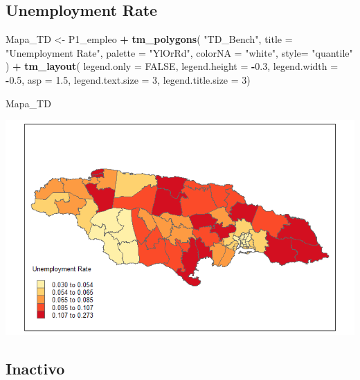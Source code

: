 \documentclass[
  12pt,
]{book}
\newenvironment{Shaded}{\begin{snugshade}}{\end{snugshade}}
\newcommand{\AttributeTok}[1]{\textcolor[rgb]{0.13,0.29,0.53}{#1}}
\newcommand{\ConstantTok}[1]{\textcolor[rgb]{0.56,0.35,0.01}{#1}}
\newcommand{\DecValTok}[1]{\textcolor[rgb]{0.00,0.00,0.81}{#1}}
\newcommand{\FloatTok}[1]{\textcolor[rgb]{0.00,0.00,0.81}{#1}}
\newcommand{\FunctionTok}[1]{\textcolor[rgb]{0.13,0.29,0.53}{\textbf{#1}}}
\newcommand{\NormalTok}[1]{#1}
\newcommand{\OtherTok}[1]{\textcolor[rgb]{0.56,0.35,0.01}{#1}}
\newcommand{\SpecialCharTok}[1]{\textcolor[rgb]{0.81,0.36,0.00}{\textbf{#1}}}
\newcommand{\StringTok}[1]{\textcolor[rgb]{0.31,0.60,0.02}{#1}}
\begin{document}
\hypertarget{unemployment-rate-1}{%
\subsection*{Unemployment Rate}\label{unemployment-rate-1}}

\begin{Shaded}
\begin{Highlighting}[]
\NormalTok{Mapa\_TD }\OtherTok{\textless{}{-}}
\NormalTok{  P1\_empleo }\SpecialCharTok{+} \FunctionTok{tm\_polygons}\NormalTok{(}
    \StringTok{"TD\_Bench"}\NormalTok{,}
    \AttributeTok{title =}  \StringTok{"Unemployment Rate"}\NormalTok{,}
    \AttributeTok{palette =} \StringTok{"YlOrRd"}\NormalTok{,}
    \AttributeTok{colorNA =} \StringTok{"white"}\NormalTok{,}
    \AttributeTok{style=} \StringTok{"quantile"}
\NormalTok{  ) }\SpecialCharTok{+} \FunctionTok{tm\_layout}\NormalTok{( }
    \AttributeTok{legend.only =} \ConstantTok{FALSE}\NormalTok{,}
    \AttributeTok{legend.height =} \SpecialCharTok{{-}}\FloatTok{0.3}\NormalTok{,}
    \AttributeTok{legend.width =} \SpecialCharTok{{-}}\FloatTok{0.5}\NormalTok{,}
    \AttributeTok{asp =} \FloatTok{1.5}\NormalTok{,}
    \AttributeTok{legend.text.size =} \DecValTok{3}\NormalTok{,}
    \AttributeTok{legend.title.size =} \DecValTok{3}\NormalTok{)}


\NormalTok{Mapa\_TD}
\end{Highlighting}
\end{Shaded}

\includegraphics{Recursos/05_Empleo/17_map_TD.png}

\hypertarget{inactivo}{%
\subsection*{Inactivo}\label{inactivo}}
\end{document}
